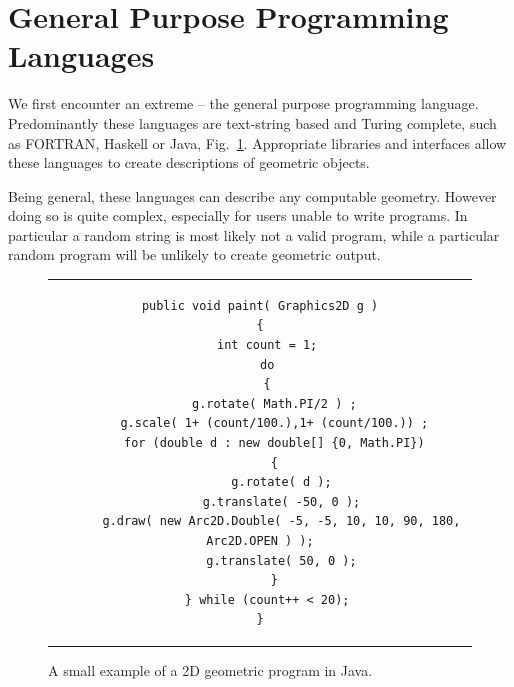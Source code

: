

\section{General Purpose Programming Languages}
\label{s:gppl}

We first encounter an extreme -- the general purpose programming language. Predominantly these languages are text-string based and Turing complete\cite{turing:1936}, such as FORTRAN\cite{IBM57}, Haskell\cite{Hudak92} or Java\cite{Gosling96}, Fig.~\ref{java}. Appropriate libraries and interfaces allow these languages to create descriptions of geometric objects. 

Being general, these languages can describe any computable geometry. However doing so is quite complex, especially for users unable to write programs. In particular a random string is most likely not a valid program, while a particular random program will be unlikely to create geometric output.

\medskip

\begin{figure}
\centering
\lstset{language=Java, basicstyle=\footnotesize} 
\begin{tabular}{c}
\begin{lstlisting}
public void paint( Graphics2D g )
{
  int count = 1;
  do
  {
    g.rotate( Math.PI/2 ) ;
    g.scale( 1+ (count/100.),1+ (count/100.)) ;
    for (double d : new double[] {0, Math.PI})
    {
      g.rotate( d );
      g.translate( -50, 0 );
      g.draw( new Arc2D.Double( -5, -5, 10, 10, 90, 180, Arc2D.OPEN ) );
      g.translate( 50, 0 );
    }
  } while (count++ < 20);
}
\end{lstlisting}
\end{tabular}
\caption[A Java program]{A small example of a 2D geometric program in Java.}
\label{java}
\end{figure}

